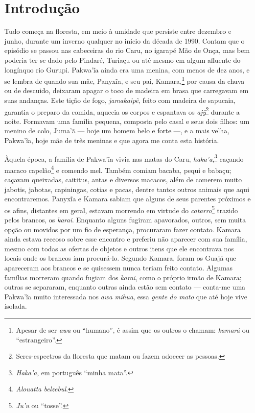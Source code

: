 \chapter*{Introdução\smallskip{}}

Tudo começa na floresta, em meio à umidade que persiste entre dezembro e
junho, durante um inverno qualquer no início da década de 1990. Contam
que o episódio se passou nas cabeceiras do rio Caru, no igarapé
Mão de Onça, mas bem poderia ter se dado pelo Pindaré, Turiaçu ou até
mesmo em algum afluente do longínquo rio Gurupi. Pakwa'ĩa ainda era uma
menina, com menos de dez anos, e se lembra de quando sua mãe, Panyxĩa, e
seu pai, Kamara,\footnote{Apesar de ser \textit{awa} ou ``humano'', é assim que
os outros o chamam: \textit{kamará} ou ``estrangeiro''.} por causa da chuva ou
de descuido, deixaram apagar o toco de madeira em brasa que carregavam
em suas andanças. Este tição de fogo, \textit{jamakaipẽ}, feito com
madeira de sapucaia, garantia o preparo da comida, aquecia os corpos e
espantava os \textit{ajỹ}\footnote{Seres-espectros da floresta que matam ou fazem
adoecer as pessoas.} durante a noite. Formavam uma família pequena,
composta pelo casal e seus dois filhos: um menino de colo, Juma'ã --- hoje
um homem belo e forte ---, e a mais velha, Pakwa'ĩa, hoje mãe de três
meninas e que agora me conta esta história.

Àquela época, a família de Pakwa'ĩa vivia nas matas do Caru,
\textit{haka'a},\footnote{\textit{Haka'a}, em português ``minha mata''.} caçando macaco capelão\footnote{\textit{Alouatta
belzebul}.} e comendo mel. Também comiam bacaba, pequi e babaçu; caçavam
queixadas, caititus, antas e diversos macacos, além de comerem muito
jabotis, jabotas, capiningas, cotias e pacas, dentre tantos outros
animais que aqui encontraremos. Panyxĩa e Kamara sabiam que alguns de
seus parentes próximos e os afins, distantes em geral, estavam morrendo
em virtude do \textit{catarro}\footnote{\textit{Ju'u} ou ``tosse''.} trazido pelos
brancos, os \textit{karai}. Enquanto alguns fugiram apavorados,
outros, sem muita opção ou movidos por um fio de esperança, procuraram
fazer contato. Kamara ainda estava receoso sobre esse encontro e
preferiu não aparecer com sua família, mesmo com todas as ofertas de
objetos e outros itens que ele encontrava nos locais onde os
brancos iam procurá-lo. Segundo Kamara, foram os Guajá que
apareceram aos brancos e se quisessem nunca teriam feito contato. Algumas famílias morreram quando fugiam dos \textit{karai}, como
o próprio irmão de Kamara; outras se separaram, enquanto outras ainda
estão sem contato --- conta-me uma Pakwa'ĩa muito interessada nos
\textit{awa mihua}, essa \textit{gente do mato} que até hoje vive isolada.

